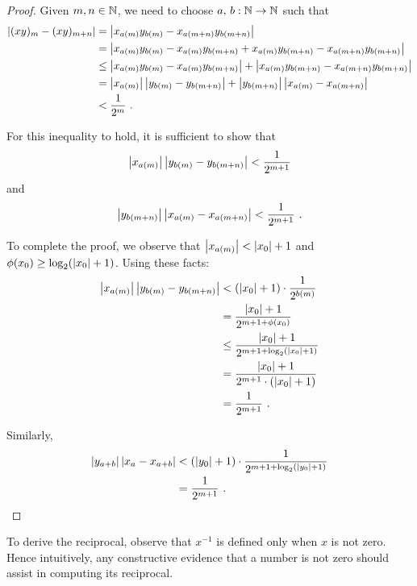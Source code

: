 \documentclass[leqno]{report}
\begin{document}
\begin{proof}
    Given $m, n \in \mathbb{N}$, we need to choose $a,\, b : \mathbb{N} \rightarrow \mathbb{N}$ such that
    \begin{align*}
        \left| (xy)_m - (xy)_{m+n} \right|
        &= \left| x_{a(m)} y_{b(m)} - x_{a(m+n)} y_{b(m+n)} \right| \\
        &= \left| x_{a(m)} y_{b(m)} - x_{a(m)} y_{b(m+n)} + x_{a(m)} y_{b(m+n)} - x_{a(m+n)} y_{b(m+n)} \right| \\
        &\leq \left| x_{a(m)} y_{b(m)} - x_{a(m)} y_{b(m+n)} \right| + \left| x_{a(m)} y_{b(m+n)} - x_{a(m+n)} y_{b(m+n)} \right| \\
        &= \left| x_{a(m)} \right|\left| y_{b(m)} - y_{b(m+n)} \right| + \left| y_{b(m+n)} \right|\left| x_{a(m)} - x_{a(m+n)} \right| \\
        &< \frac{1}{2^m}
        \ .
    \end{align*}

    For this inequality to hold, it is sufficient to show that
    \[ \left| x_{a(m)} \right|\left| y_{b(m)} - y_{b(m+n)} \right| < \frac{1}{2^{m+1}} \]
    and
    \[ \left| y_{b(m+n)} \right|\left| x_{a(m)} - x_{a(m+n)} \right| < \frac{1}{2^{m+1}} \ . \]

    To complete the proof, we observe that $\left| x_{a(m)} \right| < \left| x_0 \right| + 1$ and $\phi(x_0) \geq \log_2(\left| x_0 \right| + 1)$. Using these facts:
    \begin{align*}
        \left| x_{a(m)} \right|\left| y_{b(m)} - y_{b(m+n)} \right|
        &< (\left| x_0 \right| + 1) \cdot \frac{1}{2^{b(m)}} \\
        &= \frac{\left| x_0 \right| + 1}{2^{m + 1 + \phi(x_0)}} \\
        &\leq \frac{\left| x_0 \right| + 1}{2^{m + 1 + \log_2(\left| x_0 \right| + 1)}} \\
        &= \frac{\left| x_0 \right| + 1}{2^{m + 1} \cdot (\left| x_0 \right| + 1)} \\
        &= \frac{1}{2^{m + 1}}
        \ .
    \end{align*}

    Similarly,
    \begin{align*}
        \left| y_{a+b} \right|\left| x_a - x_{a+b} \right|
        &< (\left| y_0 \right| + 1) \cdot \frac{1}{2^{m + 1 + \log_2(\left| y_0 \right| + 1)}} \\
        &= \frac{1}{2^{m + 1}}
        \ . \qedhere
    \end{align*}
\end{proof}

To derive the reciprocal, observe that $x^{-1}$ is defined only when $x$ is not zero. Hence intuitively, any constructive evidence that a number is not zero should assist in computing its reciprocal.
\end{document}

